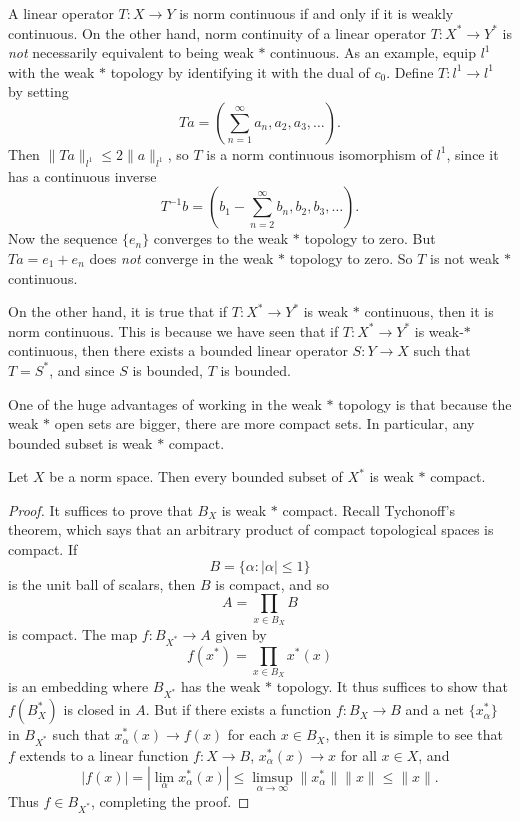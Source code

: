\begin{example}
    A linear operator $T: X \to Y$ is norm continuous if and only if it is weakly continuous. On the other hand, norm continuity of a linear operator $T: X^* \to Y^*$ is \emph{not} necessarily equivalent to being weak $*$ continuous. As an example, equip $l^1$ with the weak $*$ topology by identifying it with the dual of $c_0$. Define $T: l^1 \to l^1$ by setting
    \[ Ta = \left( \sum_{n = 1}^\infty a_n, a_2, a_3, \dots \right). \]
    Then $\| Ta \|_{l^1} \leq 2 \| a \|_{l^1}$, so $T$ is a norm continuous isomorphism of $l^1$, since it has a continuous inverse
    \[ T^{-1}b = \left( b_1 - \sum_{n = 2}^\infty b_n, b_2, b_3, \dots \right). \]
    Now the sequence $\{ e_n \}$ converges to the weak $*$ topology to zero. But $Ta = e_1 + e_n$ does \emph{not} converge in the weak $*$ topology to zero. So $T$ is not weak $*$ continuous.
\end{example}

On the other hand, it is true that if $T: X^* \to Y^*$ is weak $*$ continuous, then it is norm continuous. This is because we have seen that if $T: X^* \to Y^*$ is weak-$*$ continuous, then there exists a bounded linear operator $S: Y \to X$ such that $T = S^*$, and since $S$ is bounded, $T$ is bounded.

One of the huge advantages of working in the weak $*$ topology is that because the weak $*$ open sets are bigger, there are more compact sets. In particular, any bounded subset is weak $*$ compact.

\begin{theorem}
    Let $X$ be a norm space. Then every bounded subset of $X^*$ is weak $*$ compact.
\end{theorem}
\begin{proof}
    It suffices to prove that $B_X$ is weak $*$ compact. Recall Tychonoff's theorem, which says that an arbitrary product of compact topological spaces is compact. If
    \[ B = \{ \alpha : |\alpha| \leq 1 \} \]
    is the unit ball of scalars, then $B$ is compact, and so
    \[ A = \prod_{x \in B_X} B \]
    is compact. The map $f: B_{X^*} \to A$ given by
    \[ f(x^*) = \prod_{x \in B_X} x^*(x) \]
    is an embedding where $B_{X^*}$ has the weak $*$ topology. It thus suffices to show that $f(B_X^*)$ is closed in $A$. But if there exists a function $f: B_X \to B$ and a net $\{ x_\alpha^* \}$ in $B_{X^*}$ such that $x_\alpha^*(x) \to f(x)$ for each $x \in B_X$, then it is simple to see that $f$ extends to a linear function $f: X \to B$, $x_\alpha^*(x) \to x$ for all $x \in X$, and
    \[ |f(x)| = |\lim_{\alpha} x_\alpha^*(x)| \leq \limsup_{\alpha \to \infty} \| x_\alpha^* \| \| x \| \leq \| x \|. \]
    Thus $f \in B_{X^*}$, completing the proof.
\end{proof}

